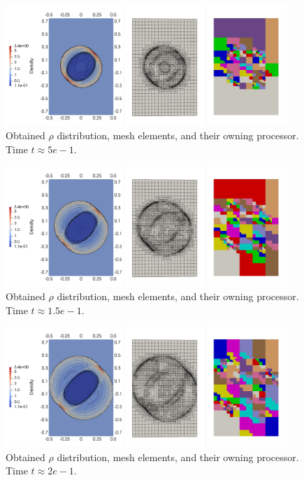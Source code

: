 \begin{figure}[H]
	\begin{center}
		\includegraphics[width=0.95\textwidth]{img/mhd-blast/new/adapt-full1.jpg}
\vspace{-3mm}
	\caption{Obtained $\rho$ distribution, mesh elements, and their owning processor. Time $t\approx 5e-1$.}
	\label{figure:amrBlast2}
	\end{center}
\end{figure}
\vspace{-10mm}

\begin{figure}[H]
	\begin{center}
		\includegraphics[width=0.95\textwidth]{img/mhd-blast/new/adapt-full2.jpg}
\vspace{-3mm}
	\caption{Obtained $\rho$ distribution, mesh elements, and their owning processor. Time $t\approx 1.5e-1$.}
	\label{figure:amrBlast3}
	\end{center}
\end{figure}
\vspace{-10mm}

\begin{figure}[H]
	\begin{center}
		\includegraphics[width=0.95\textwidth]{img/mhd-blast/new/adapt-full3.jpg}
\vspace{-3mm}
	\caption{Obtained $\rho$ distribution, mesh elements, and their owning processor. Time $t\approx 2e-1$.}
	\label{figure:amrBlast4}
	\end{center}
\end{figure}
\vspace{-10mm}

